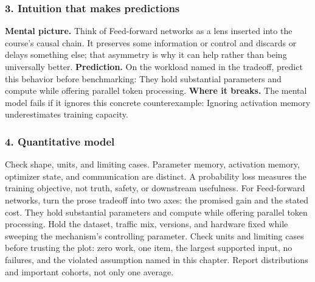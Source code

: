 \subsubsection*{3. Intuition that makes predictions}
\textbf{Mental picture.} Think of Feed-forward networks as a lens inserted into the course's causal chain. It preserves some information or control and discards or delays something else; that asymmetry is why it can help rather than being universally better.
\textbf{Prediction.} On the workload named in the tradeoff, predict this behavior before benchmarking: They hold substantial parameters and compute while offering parallel token processing.
\textbf{Where it breaks.} The mental model fails if it ignores this concrete counterexample: Ignoring activation memory underestimates training capacity.
\subsubsection*{4. Quantitative model}
Check shape, units, and limiting cases. Parameter memory, activation memory, optimizer state, and communication are distinct. A probability loss measures the training objective, not truth, safety, or downstream usefulness.
For Feed-forward networks, turn the prose tradeoff into two axes: the promised gain and the stated cost. They hold substantial parameters and compute while offering parallel token processing. Hold the dataset, traffic mix, versions, and hardware fixed while sweeping the mechanism's controlling parameter.
Check units and limiting cases before trusting the plot: zero work, one item, the largest supported input, no failures, and the violated assumption named in this chapter. Report distributions and important cohorts, not only one average.
